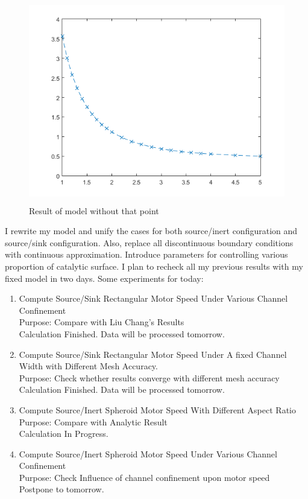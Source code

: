 \documentclass[fontsize=11pt, %
                             paper=a4, %
                             twoside, %
                             captions=tableheading,
                             index=totoc,
                             hyperref]{labbook}
\begin{document}
\begin{addmargin}[4cm]{0cm}
\begin{figure}
\includegraphics[width=\linewidth, height=3.5in]{2016-11-18-SourceSink-New.png}
\caption{Result of model without that point}\label{2016-11-18-ROMWTP}
\end{figure}

I rewrite my model and unify the cases for both source/inert configuration and source/sink configuration. Also, replace all discontinuous boundary conditions with continuous approximation. Introduce parameters for controlling various proportion of catalytic surface. I plan to recheck all my previous results with my fixed model in two days. Some experiments for today:
\begin{enumerate}
\item
Compute Source/Sink Rectangular Motor Speed Under Various Channel Confinement\\
Purpose: Compare with Liu Chang's Results\\
Calculation Finished. Data will be processed tomorrow.
\item
Compute Source/Sink Rectangular Motor Speed Under A fixed Channel Width with Different Mesh Accuracy.\\
Purpose: Check whether results converge with different mesh accuracy\\
Calculation Finished. Data will be processed tomorrow.
\item
Compute Source/Inert Spheroid Motor Speed With Different Aspect Ratio\\
Purpose: Compare with Analytic Result\\
Calculation In Progress.
\item
Compute Source/Inert Spheroid Motor Speed Under Various Channel Confinement\\
Purpose: Check Influence of channel confinement upon motor speed\\
Postpone to tomorrow.
\end{enumerate}


\end{addmargin}
\end{document}
